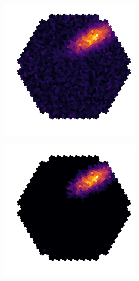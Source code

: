 \begin{figure}
\begin{figure}
	\centering
	\captionsetup{width=0.9\linewidth}
	\begin{subfigure}{.45\textwidth}
  		\centering
  		\includegraphics[width=\linewidth]{Plots/hillas_raw.pdf}
	\end{subfigure}%
	\begin{subfigure}{.45\textwidth}
 		\centering
		\includegraphics[width=\linewidth]{Plots/hillas_cleaned.pdf}

\end{subfigure}
\end{figure}
\end{figure}
